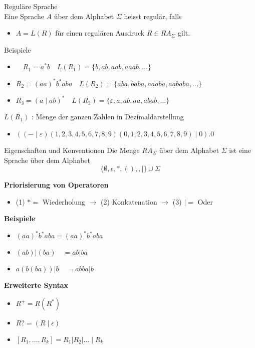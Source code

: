 \begin{definition}{Reguläre Sprache}\\
    Eine Sprache $A$ über dem Alphabet $\Sigma$ heisst regulär, falls
    \begin{itemize}
        \item $A=L(R)$ für einen regulären Ausdruck $R \in R A_{\Sigma}$ gilt.
    \end{itemize}

    Beispiele
    \begin{itemize}
    \item $\quad R_{1}=a^{*} b \quad L\left(R_{1}\right)=\{b, a b, a a b, a a a b, \ldots\}$
    \item $R_{2}=(a a)^{*} b^{*} a b a \quad L\left(R_{2}\right)=\{a b a, b a b a, a a a b a, a a b a b a, \ldots\}$
    \item $R_{3}=(a \mid a b)^{*} \quad L\left(R_{3}\right)=\{\varepsilon, a, a b, a a, a b a b, \ldots\}$
    \end{itemize}

    $L\left(R_{1}\right)$ : Menge der ganzen Zahlen in Dezimaldarstellung
    \begin{itemize}
    \item $((-\mid \varepsilon)(1,2,3,4,5,6,7,8,9)(0,1,2,3,4,5,6,7,8,9) \mid 0) .0$
    \end{itemize}
\end{definition}    


\begin{KR}{Eigenschaften und Konventionen}
    Die Menge $R A_{\Sigma}$ über dem Alphabet $\Sigma$ ist eine Sprache über dem Alphabet 
    $$\{\emptyset, \epsilon, *,(),, \mid\} \cup \Sigma$$

    \textbf{Priorisierung von Operatoren}
    \begin{itemize}
    \item (1) $*=$ Wiederholung $\rightarrow$ (2) Konkatenation $\rightarrow$ (3) $\mid=$ Oder
    \end{itemize}

    \textbf{Beispiele}
    \begin{itemize}
    \item $(a a)^{*} b^{*} a b a=(a a)^{*} b^{*} a b a$
    \item $(a b)|(b a) \quad=a b| b a$
    \item $a(b(b a))|b \quad=a b b a| b$
    \end{itemize}

    \textbf{Erweiterte Syntax}
    \begin{itemize}
    \item $R^{+}=R\left(R^{*}\right)$
    \item $R ?=(R \mid \epsilon)$
    \item $\left[R_{1}, \ldots, R_{k}\right]=R_{1}\left|R_{2}\right| \ldots \mid R_{k}$
    \end{itemize}
\end{KR}